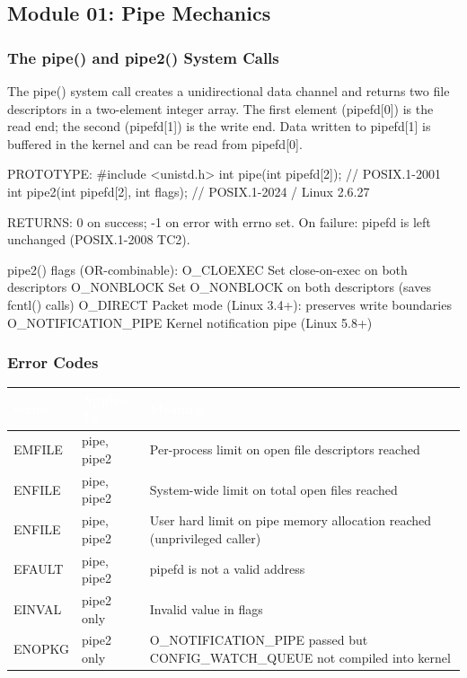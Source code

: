 \documentclass[11pt,letterpaper]{article}
\newcommand{\tableheader}[1]{\textbf{\sffamily\textcolor{white}{#1}}}
\begin{document}
\subsection{Module 01: Pipe Mechanics}

\subsubsection{The pipe() and pipe2() System Calls}

The pipe() system call creates a unidirectional data channel and returns two file descriptors in a two-element integer array. The first element (pipefd[0]) is the read end; the second (pipefd[1]) is the write end. Data written to pipefd[1] is buffered in the kernel and can be read from pipefd[0].

\begin{codebox}
PROTOTYPE:
  #include <unistd.h>
  int pipe(int pipefd[2]);                         // POSIX.1-2001
  int pipe2(int pipefd[2], int flags);             // POSIX.1-2024 / Linux 2.6.27

RETURNS:
  0 on success; -1 on error with errno set.
  On failure: pipefd is left unchanged (POSIX.1-2008 TC2).

pipe2() flags (OR-combinable):
  O_CLOEXEC       Set close-on-exec on both descriptors
  O_NONBLOCK      Set O_NONBLOCK on both descriptors (saves fcntl() calls)
  O_DIRECT        Packet mode (Linux 3.4+): preserves write boundaries
  O_NOTIFICATION_PIPE  Kernel notification pipe (Linux 5.8+)
\end{codebox}

\subsubsection{Error Codes}

\begin{center}
\begin{tabularx}{\textwidth}{L{2.5cm}L{2cm}X}
\toprule
{}
\tableheader{errno} & \tableheader{Applies To} & \tableheader{Meaning} \\
\midrule
EMFILE & pipe, pipe2 & Per-process limit on open file descriptors reached \\
ENFILE & pipe, pipe2 & System-wide limit on total open files reached \\
ENFILE & pipe, pipe2 & User hard limit on pipe memory allocation reached (unprivileged caller) \\
EFAULT & pipe, pipe2 & pipefd is not a valid address \\
EINVAL & pipe2 only & Invalid value in flags \\
ENOPKG & pipe2 only & O\_NOTIFICATION\_PIPE passed but CONFIG\_WATCH\_QUEUE not compiled into kernel \\
\bottomrule
\end{tabularx}
\end{center}
\end{document}
